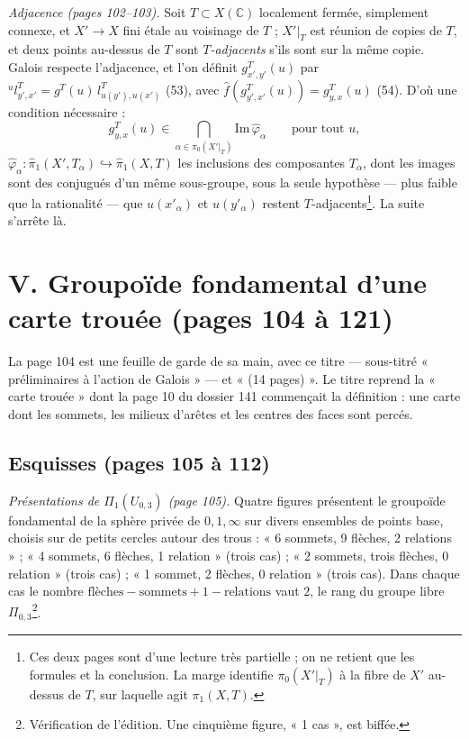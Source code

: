 \documentclass[11pt,a4paper]{article}
\begin{document}
\emph{Adjacence (pages 102–103).} Soit $T \subset X(\mathbb{C})$ localement
fermée, simplement connexe, et $X' \to X$ fini étale au voisinage de $T$ ;
$X'|_T$ est réunion de copies de $T$, et deux points au-dessus de $T$ sont
\emph{$T$-adjacents} s'ils sont sur la même copie. Galois respecte
l'adjacence, et l'on définit $g^T_{x',y'}(u)$ par
${}^{u}l^T_{y',x'} = g^T(u)\, l^T_{u(y'),u(x')}$ (53), avec
$\widehat f(g^T_{y',x'}(u)) = g^T_{y,x}(u)$ (54). D'où une condition nécessaire :
\[
g^{T}_{y,x}(u) \in \bigcap_{\alpha \in \pi_0(X'|_T)} \mathrm{Im}\,\widehat\varphi_\alpha \qquad \text{pour tout } u ,
\]
$\widehat\varphi_\alpha : \widehat\pi_1(X', T_\alpha) \hookrightarrow
\widehat\pi_1(X, T)$ les inclusions des composantes $T_\alpha$, dont les images
sont des conjugués d'un même sous-groupe, sous la seule hypothèse — plus faible
que la rationalité — que $u(x'_\alpha)$ et $u(y'_\alpha)$ restent
$T$-adjacents\footnote{Ces deux pages sont d'une lecture très partielle ;
on ne retient que les formules et la conclusion. La marge identifie
$\pi_0(X'|_T)$ à la fibre de $X'$ au-dessus de $T$, sur laquelle agit
$\pi_1(X, T)$.}. La suite s'arrête là.

\section*{V. Groupoïde fondamental d'une carte trouée (pages 104 à 121)}

La page 104 est une feuille de garde de sa main, avec ce titre — sous-titré
« préliminaires à l'action de Galois » — et « (14 pages) ». Le titre reprend
la « carte trouée » dont la page 10 du dossier 141 commençait la définition :
une carte dont les sommets, les milieux d'arêtes et les centres des faces sont
percés.

\subsection*{Esquisses (pages 105 à 112)}

\emph{Présentations de $\Pi_1(U_{0,3})$ (page 105).} Quatre figures présentent
le groupoïde fondamental de la sphère privée de $0, 1, \infty$ sur divers
ensembles de points base, choisis sur de petits cercles autour des trous :
« 6 sommets, 9 flèches, 2 relations » ; « 4 sommets, 6 flèches, 1 relation »
(trois cas) ; « 2 sommets, trois flèches, 0 relation » (trois cas) ;
« 1 sommet, 2 flèches, 0 relation » (trois cas). Dans chaque cas le nombre
$\text{flèches} - \text{sommets} + 1 - \text{relations}$ vaut $2$, le rang du
groupe libre $\Pi_{0,3}$\footnote{Vérification de l'édition. Une cinquième
figure, « 1 cas », est biffée.}.
\end{document}
